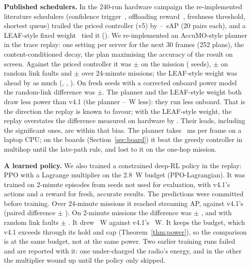 \documentclass[conference]{IEEEtran}
\begin{document}
\textbf{Published schedulers.} In the 240-run hardware campaign the re-implemented literature schedulers (confidence trigger~\cite{Gomez_2024}, offloading
reward~\cite{Qiu_2024}, freshness threshold, shortest queue) trailed the priced controller (v5) by
\LitBehindMin--\LitBehindMax~sAP (20 pairs each), and a LEAF-style fixed weight~\cite{Wang_2023} tied it (\MainLeaf{}). We re-implemented an
AccuMO-style planner in the trace replay: one setting per server for the next 30 frames (252 plans), the
content-conditioned decay, the plan maximising the accuracy of the result on screen. Against the priced controller it
was \MpcMission{}$\pm$\MpcMissionCi{} on the mission (\MpcMissionN{} seeds), \MpcRandom{}$\pm$\MpcRandomCi{} on random
link faults and \MpcLong{}$\pm$\MpcLongCi{} over 24-minute missions; the LEAF-style weight was ahead by as much
(\LeafMission{}, \LeafRandom{}, \LeafLong{}). On fresh seeds with a corrected onboard power model the random-link
difference was \MpcHeldRandom{}$\pm$\MpcHeldRandomCi{}. The planner and the LEAF-style weight both draw less power than v4.1 (the planner \MpcLessWMin--\MpcLessWMax~W less):
they run less onboard. That is the direction the replay is known to favour; with the LEAF-style weight, the replay
overstates the difference measured on hardware by \ReplayLeafBias{}. Their leads, including the significant ones, are
within that bias. The planner takes \MpcMs{}~ms per frame on a laptop CPU; on the boards (Section~\ref{sec:board}) it
beat the greedy controller in multihop until the late-path rule, and lost to it on the one-hop mission.

\textbf{A learned policy.} We also trained a constrained deep-RL policy in the replay: PPO with a Lagrange multiplier on
the 2.8~W budget (PPO-Lagrangian). It was trained on 2-minute episodes from seeds not used for evaluation, with v4.1's
actions and a reward for fresh, accurate results. The predictions were committed before training. Over 24-minute
missions it reached \RlLongSap{} streaming AP, against v4.1's \RlLongVSap{} (paired difference \RlLongDiff{} $\pm$
\RlLongDiffCi). On 2-minute missions the difference was \RlMisDiff{} $\pm$ \RlMisDiffCi{}, and with random link faults
\RlRndDiff{} $\pm$ \RlRndDiffCi. It drew \RlLongPower~W against v4.1's \RlLongVPower~W. It keeps the budget, which v4.1
exceeds through its hold and cap (Theorem~\ref{thm:power}), so the comparison is at the same budget, not at the same
power. Two earlier training runs failed and are reported with it: one under-charged the radio's energy, and in the
other the multiplier wound up until the policy only skipped.
\end{document}
